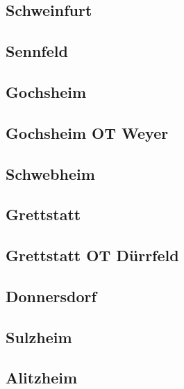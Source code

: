 \documentclass[fontsize=12pt,a4paper]{scrreprt}
\begin{document}
\subsection{Schweinfurt}


\subsection{Sennfeld}


\subsection{Gochsheim}


\subsection{Gochsheim OT Weyer}


\subsection{Schwebheim}


\subsection{Grettstatt}


\subsection{Grettstatt OT Dürrfeld}


\subsection{Donnersdorf}


\subsection{Sulzheim}


\subsection{Alitzheim}

\end{document}
